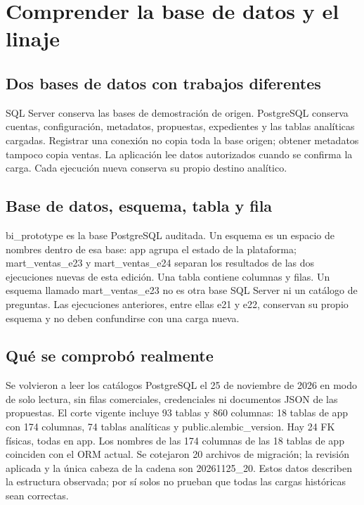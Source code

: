 \chapter{Comprender la base de datos y el linaje}
\section{Dos bases de datos con trabajos diferentes}
SQL Server conserva las bases de demostración de origen. PostgreSQL conserva cuentas, configuración, metadatos, propuestas, expedientes y las tablas analíticas cargadas. Registrar una conexión no copia toda la base origen; obtener metadatos tampoco copia ventas. La aplicación lee datos autorizados cuando se confirma la carga. Cada ejecución nueva conserva su propio destino analítico.

\section{Base de datos, esquema, tabla y fila}
bi\_\allowbreak{}prototype es la base PostgreSQL auditada. Un esquema es un espacio de nombres dentro de esa base: app agrupa el estado de la plataforma; mart\_\allowbreak{}ventas\_\allowbreak{}e23 y mart\_\allowbreak{}ventas\_\allowbreak{}e24 separan los resultados de las dos ejecuciones nuevas de esta edición. Una tabla contiene columnas y filas. Un esquema llamado mart\_\allowbreak{}ventas\_\allowbreak{}e23 no es otra base SQL Server ni un catálogo de preguntas. Las ejecuciones anteriores, entre ellas e21 y e22, conservan su propio esquema y no deben confundirse con una carga nueva.

\section{Qué se comprobó realmente}
Se volvieron a leer los catálogos PostgreSQL el 25 de noviembre de 2026 en modo de solo lectura, sin filas comerciales, credenciales ni documentos JSON de las propuestas. El corte vigente incluye 93 tablas y 860 columnas: 18 tablas de app con 174 columnas, 74 tablas analíticas y public.alembic\_\allowbreak{}version. Hay 24 FK físicas, todas en app. Los nombres de las 174 columnas de las 18 tablas de app coinciden con el ORM actual. Se cotejaron 20 archivos de migración; la revisión aplicada y la única cabeza de la cadena son 20261125\_\allowbreak{}20. Estos datos describen la estructura observada; por sí solos no prueban que todas las cargas históricas sean correctas.

